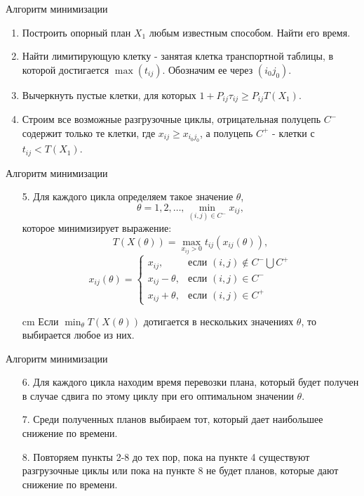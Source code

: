 \documentclass[serif,10pt,utf8, russian]{beamer}
\begin{document}
\begin{frame}{\begin{center}Алгоритм минимизации\end{center}}
\begin{enumerate}
\item Построить опорный план $X_1$ любым известным способом. Найти его время.
\pause
\item Найти лимитирующую клетку - занятая клетка транспортной таблицы, в которой достигается $\max{\left(t_{ij}\right)}$. Обозначим ее через $\left(i_0 j_0\right)$.
\pause
\item Вычеркнуть пустые клетки, для которых $1+P_{ij}\tau_{ij}\ge P_{ij}T\left(X_1\right)$.
\pause
\item Строим все возможные разгрузочные циклы, отрицательная полуцепь $C^{-}$ содержит только те клетки, где $x_{ij}\ge x_{i_0 j_0}$, а полуцепь $C^{+}$ - клетки с $t_{ij}<T\left(X_1\right)$.
\end{enumerate}
\end{frame}

\begin{frame}{\begin{center}Алгоритм минимизации\end{center}}
\begin{enumerate}
\item[5.] Для каждого цикла определяем такое значение $\theta$,
$$ \theta = 1,2,\dots, \min_{\left(i,j\right)\in C^{-}}{x_{ij}},$$
которое минимизирует выражение:
$$T\left(X\left(\theta\right)\right)=\max_{x_{ij}>0}{t_{ij}\left(x_{ij}\left(\theta\right)\right)},$$
$$x_{ij}\left(\theta\right)=\begin{cases}
x_{ij}, & \text{если $\left(i,j\right)\notin C^{-}\bigcup C^{+}$}\\
x_{ij}-\theta, & \text{если $\left(i,j\right)\in C^{-}$}\\
x_{ij}+\theta, & \text{если $\left(i,j\right)\in C^{+}$}
\end{cases}$$
\parbox {11 cm}{ cm Если $\min_{\theta}{T\left(X\left(\theta\right)\right)}$ дотигается в нескольких значениях $\theta$, то выбирается любое из них.}
\end{enumerate}
\end{frame}

\begin{frame}{\begin{center}Алгоритм минимизации\end{center}}
\begin{enumerate}
\item[6.] Для каждого цикла находим время перевозки плана, который будет получен в случае сдвига по этому циклу при его оптимальном значении $\theta$.
\pause
\item[7.] Среди полученных планов выбираем тот, который дает наибольшее снижение по времени.
\pause
\item[8.] Повторяем пункты 2-8 до тех пор, пока на пункте 4 существуют разгрузочные циклы или пока на пункте 8 не будет планов, которые дают снижение по времени.
\end{enumerate}
\end{frame}
\end{document}
